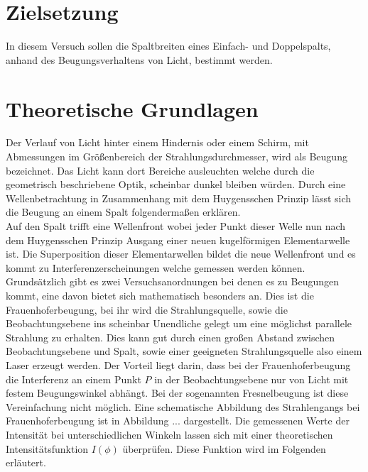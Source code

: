 \section{Zielsetzung}
In diesem Versuch sollen die Spaltbreiten eines Einfach- und Doppelspalts, anhand des Beugungsverhaltens von Licht, bestimmt werden.

\section{Theoretische Grundlagen}
Der Verlauf von Licht hinter einem Hindernis oder einem Schirm, mit Abmessungen im Größenbereich der Strahlungsdurchmesser, wird als Beugung bezeichnet. Das Licht kann dort Bereiche ausleuchten welche durch die geometrisch beschriebene Optik, scheinbar dunkel bleiben würden. Durch eine Wellenbetrachtung in Zusammenhang mit dem Huygensschen Prinzip lässt sich die Beugung an einem Spalt folgendermaßen erklären. 
\\
Auf den Spalt trifft eine Wellenfront wobei jeder Punkt dieser Welle nun nach dem Huygensschen Prinzip Ausgang einer neuen kugelförmigen Elementarwelle ist. Die Superposition dieser Elementarwellen bildet die neue Wellenfront und es kommt zu Interferenzerscheinungen welche gemessen werden können.
\\
Grundsätzlich gibt es zwei Versuchsanordnungen bei denen es zu Beugungen kommt, eine davon bietet sich mathematisch besonders an. Dies ist die Frauenhoferbeugung, bei ihr wird die Strahlungsquelle, sowie die Beobachtungsebene ins scheinbar Unendliche gelegt um eine möglichst parallele Strahlung zu erhalten. Dies kann gut durch einen großen Abstand zwischen Beobachtungsebene und Spalt, sowie einer geeigneten Strahlungsquelle also einem Laser erzeugt werden. Der Vorteil liegt darin, dass bei der Frauenhoferbeugung die Interferenz an einem Punkt $P$ in der Beobachtungsebene nur von Licht mit festem Beugungswinkel abhängt. Bei der sogenannten Fresnelbeugung ist diese Vereinfachung nicht möglich. Eine schematische Abbildung des Strahlengangs bei Frauenhoferbeugung ist in Abbildung ... dargestellt.
Die gemessenen Werte der Intensität bei unterschiedlichen Winkeln lassen sich mit einer theoretischen Intensitätsfunktion $I(\phi)$ überprüfen. Diese Funktion wird im Folgenden erläutert.

